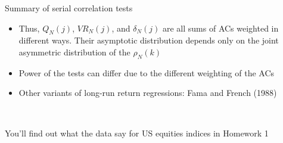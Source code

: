 \documentclass[xcolor=table, aspectratio=169]{beamer}
\begin{document}
\begin{frame}{Summary of serial correlation tests}
\begin{itemize}
\item Thus, $Q_N(j)$, $VR_N(j)$, and $\delta_N(j)$ are all sums of ACs weighted in different ways. Their asymptotic distribution depends only on the joint asymmetric distribution of the $\rho_N(k)$
\item Power of the tests can differ due to the different weighting of the ACs
\item Other variants of long-run return regressions: Fama and French (1988) 
\end{itemize}

~

You'll find out what the data say for US equities indices in Homework 1
\end{frame}
\end{document}
